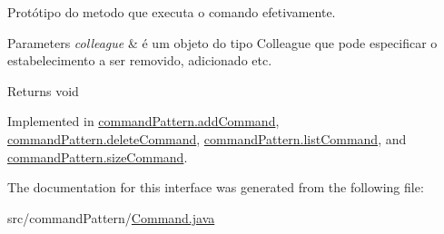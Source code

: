 Protótipo do metodo que executa o comando efetivamente. 


\begin{DoxyParams}{Parameters}
{\em colleague} & é um objeto do tipo Colleague que pode especificar o estabelecimento a ser removido, adicionado etc. \\
\hline
\end{DoxyParams}
\begin{DoxyReturn}{Returns}
void 
\end{DoxyReturn}


Implemented in \mbox{\hyperlink{classcommand_pattern_1_1add_command_a9d870d379fb2f882910b97ca19fe159c}{command\+Pattern.\+add\+Command}}, \mbox{\hyperlink{classcommand_pattern_1_1delete_command_ab05d76bc592e6e3fb795ee6eb9956b18}{command\+Pattern.\+delete\+Command}}, \mbox{\hyperlink{classcommand_pattern_1_1list_command_a07df0f4664e8ac6fa0ecb37ba49f1611}{command\+Pattern.\+list\+Command}}, and \mbox{\hyperlink{classcommand_pattern_1_1size_command_a3f91f249324283b9ba2c7239e6fbc888}{command\+Pattern.\+size\+Command}}.



The documentation for this interface was generated from the following file\+:\begin{DoxyCompactItemize}
\item 
src/command\+Pattern/\mbox{\hyperlink{_command_8java}{Command.\+java}}\end{DoxyCompactItemize}
